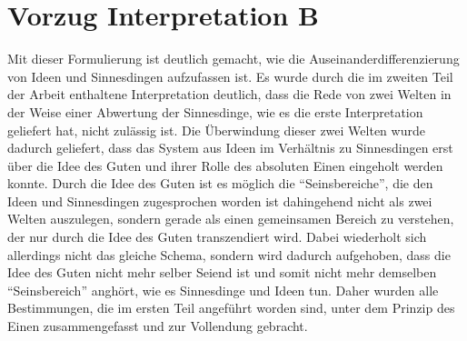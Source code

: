 \section{Vorzug Interpretation B}
Mit dieser Formulierung ist deutlich gemacht, wie die Auseinanderdifferenzierung von Ideen und Sinnesdingen aufzufassen ist.
Es wurde durch die im zweiten Teil der Arbeit enthaltene Interpretation deutlich, dass die Rede von zwei Welten in der Weise einer Abwertung der Sinnesdinge, wie es die erste Interpretation geliefert hat, nicht zulässig ist. Die Überwindung dieser zwei Welten wurde dadurch geliefert, dass das System aus Ideen im Verhältnis zu Sinnesdingen erst über die Idee des Guten und ihrer Rolle des absoluten Einen eingeholt werden konnte. Durch die Idee des Guten ist es möglich die \enquote{Seinsbereiche}, die den Ideen und Sinnesdingen zugesprochen worden ist dahingehend nicht als zwei Welten auszulegen, sondern gerade als einen gemeinsamen Bereich zu verstehen, der nur durch die Idee des Guten transzendiert wird. Dabei wiederholt sich allerdings nicht das gleiche Schema, sondern wird dadurch aufgehoben, dass die Idee des Guten nicht mehr selber Seiend ist und somit nicht mehr demselben \enquote{Seinsbereich} anghört, wie es Sinnesdinge und Ideen tun. Daher wurden alle Bestimmungen, die im ersten Teil angeführt worden sind, unter dem Prinzip des Einen zusammengefasst und zur Vollendung gebracht.\\
